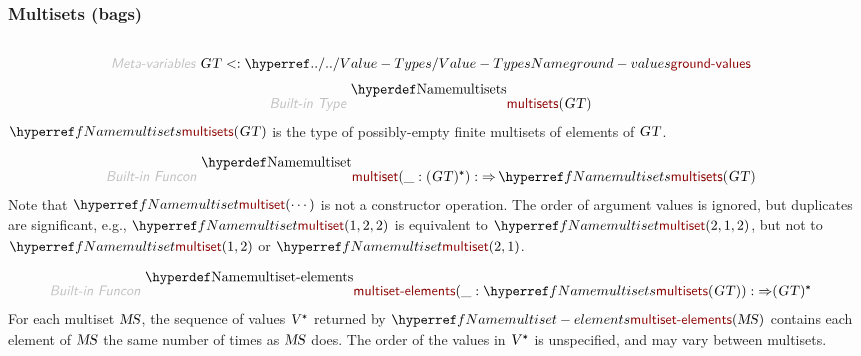 \subsubsection*{Multisets (bags)}\hypertarget{multisets-bags}{}\label{multisets-bags}

\begin{align*}
  [ ~ 
  \KEY{Type} ~ & \NAMEREF{multisets} \\
  \KEY{Funcon} ~ & \NAMEREF{multiset} \\
  \KEY{Funcon} ~ & \NAMEREF{multiset-elements} \\
  \KEY{Funcon} ~ & \NAMEREF{multiset-occurrences} \\
  \KEY{Funcon} ~ & \NAMEREF{multiset-insert} \\
  \KEY{Funcon} ~ & \NAMEREF{multiset-delete} \\
  \KEY{Funcon} ~ & \NAMEREF{is-submultiset}
  ~ ]
\end{align*}
\begin{align*}
  \KEY{Meta-variables} ~ 
  & \VAR{GT} <: \NAMEHYPER{../..}{Value-Types}{ground-values}
\end{align*}
\begin{align*}
  \KEY{Built-in Type} ~  
  & \NAMEDECL{multisets}(\VAR{GT} ) 
\end{align*}
$\SHADE{\NAMEREF{multisets}
           ( \VAR{GT} )}$ is the type of possibly-empty finite multisets of elements
  of $\SHADE{\VAR{GT}}$.

\begin{align*}
  \KEY{Built-in Funcon} ~ 
  & \NAMEDECL{multiset}(\_ : ( \VAR{GT} )\STAR) :  \TO \NAMEREF{multisets}
                                                                         ( \VAR{GT} )
\end{align*}
Note that $\SHADE{\NAMEREF{multiset}
           ( \cdots )}$ is not a constructor operation. The order of
  argument values is ignored, but duplicates are significant, e.g., 
  $\SHADE{\NAMEREF{multiset}
           ( 1,   
             2,   
             2 )}$ is equivalent to $\SHADE{\NAMEREF{multiset}
           ( 2,   
             1,   
             2 )}$, but not to
  $\SHADE{\NAMEREF{multiset}
           ( 1,   
             2 )}$ or $\SHADE{\NAMEREF{multiset}
           ( 2,   
             1 )}$.

\begin{align*}
  \KEY{Built-in Funcon} ~ 
  & \NAMEDECL{multiset-elements}(\_ : \NAMEREF{multisets}
                                ( \VAR{GT} )) :  \TO ( \VAR{GT} )\STAR
\end{align*}
For each multiset $\SHADE{\VAR{MS}}$, the sequence of values $\SHADE{\VAR{V}\STAR}$ returned by 
  $\SHADE{\NAMEREF{multiset-elements}
           ( \VAR{MS} )}$ contains each element of $\SHADE{\VAR{MS}}$ the same number of times
  as $\SHADE{\VAR{MS}}$ does.
  The order of the values in $\SHADE{\VAR{V}\STAR}$ is unspecified, and may vary between multisets.

